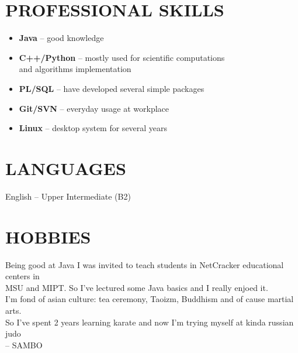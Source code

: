 \documentclass[margin,12pt]{res}
\begin{document}
\begin{resume}
\section{PROFESSIONAL SKILLS}
\begin{itemize} \itemsep -2pt
  \item \textbf{Java} -- good knowledge\\
  \item \textbf{C++/Python} -- mostly used for scientific computations\\
 and algorithms implementation\\
  \item \textbf{PL/SQL} -- have developed several simple packages\\
  \item \textbf{Git/SVN} -- everyday usage at workplace\\
  \item \textbf{Linux} -- desktop system for several years
\end{itemize}
\section{LANGUAGES} 
English -- Upper Intermediate (B2)
\section{HOBBIES}
Being good at Java I was invited to teach students in NetCracker
educational centers in\\
 MSU and MIPT. So I've lectured some Java basics
and I really enjoed it.\\
I'm fond of asian culture: tea ceremony, Taoizm, Buddhism and of cause
martial arts.\\
So I've spent 2 years learning
karate and now I'm trying myself at kinda russian judo\\ -- SAMBO

\end{resume}
\end{document}
